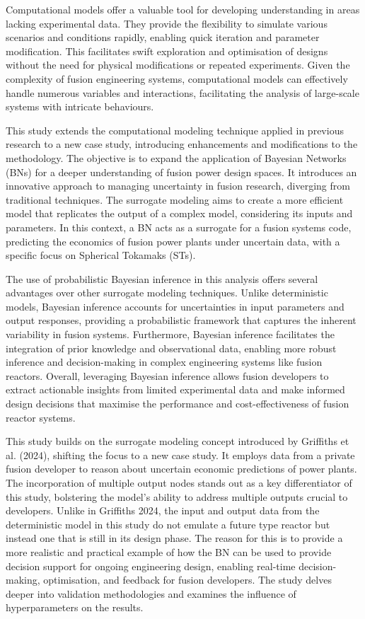 \documentclass[journal]{IEEEtran}
\begin{document}
Computational models offer a valuable tool for developing understanding in areas lacking experimental data. They provide the flexibility to simulate various scenarios and conditions rapidly, enabling quick iteration and parameter modification. This facilitates swift exploration and optimisation of designs without the need for physical modifications or repeated experiments. Given the complexity of fusion engineering systems, computational models can effectively handle numerous variables and interactions, facilitating the analysis of large-scale systems with intricate behaviours.

This study extends the computational modeling technique applied in previous research to a new case study, introducing enhancements and modifications to the methodology. The objective is to expand the application of Bayesian Networks (BNs) for a deeper understanding of fusion power design spaces. It introduces an innovative approach to managing uncertainty in fusion research, diverging from traditional techniques. The surrogate modeling aims to create a more efficient model that replicates the output of a complex model, considering its inputs and parameters. In this context, a BN acts as a surrogate for a fusion systems code, predicting the economics of fusion power plants under uncertain data, with a specific focus on Spherical Tokamaks (STs).

The use of probabilistic Bayesian inference in this analysis offers several advantages over other surrogate modeling techniques. Unlike deterministic models, Bayesian inference accounts for uncertainties in input parameters and output responses, providing a probabilistic framework that captures the inherent variability in fusion systems. Furthermore, Bayesian inference facilitates the integration of prior knowledge and observational data, enabling more robust inference and decision-making in complex engineering systems like fusion reactors. Overall, leveraging Bayesian inference allows fusion developers to extract actionable insights from limited experimental data and make informed design decisions that maximise the performance and cost-effectiveness of fusion reactor systems.

This study builds on the surrogate modeling concept introduced by Griffiths et al. (2024), shifting the focus to a new case study. It employs data from a private fusion developer to reason about uncertain economic predictions of power plants. The incorporation of multiple output nodes stands out as a key differentiator of this study, bolstering the model's ability to address multiple outputs crucial to developers. Unlike in Griffiths 2024, the input and output data from the deterministic model in this study do not emulate a future type reactor but instead one that is still in its design phase. The reason for this is to provide a more realistic and practical example of how the BN can be used to provide decision support for ongoing engineering design, enabling real-time decision-making, optimisation, and feedback for fusion developers. The study delves deeper into validation methodologies and examines the influence of hyperparameters on the results. 
\end{document}
